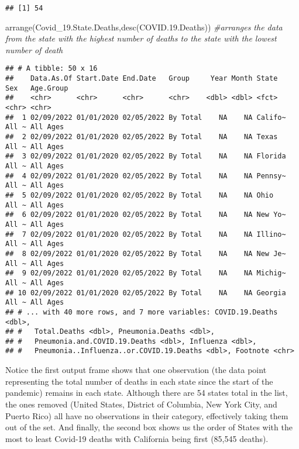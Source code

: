 \documentclass[
]{article}
\newenvironment{Shaded}{\begin{snugshade}}{\end{snugshade}}
\newcommand{\CommentTok}[1]{\textcolor[rgb]{0.56,0.35,0.01}{\textit{#1}}}
\newcommand{\FloatTok}[1]{\textcolor[rgb]{0.00,0.00,0.81}{#1}}
\newcommand{\FunctionTok}[1]{\textcolor[rgb]{0.00,0.00,0.00}{#1}}
\newcommand{\NormalTok}[1]{#1}
\begin{document}
\begin{verbatim}
## [1] 54
\end{verbatim}

\begin{Shaded}
\begin{Highlighting}[]
\FunctionTok{arrange}\NormalTok{(Covid\_19.State.Deaths,}\FunctionTok{desc}\NormalTok{(COVID.}\FloatTok{19.}\NormalTok{Deaths)) }\CommentTok{\#arranges the data from the state with the highest number of deaths to the state with the lowest number of death}
\end{Highlighting}
\end{Shaded}

\begin{verbatim}
## # A tibble: 50 x 16
##    Data.As.Of Start.Date End.Date   Group     Year Month State   Sex   Age.Group
##    <chr>      <chr>      <chr>      <chr>    <dbl> <dbl> <fct>   <chr> <chr>    
##  1 02/09/2022 01/01/2020 02/05/2022 By Total    NA    NA Califo~ All ~ All Ages 
##  2 02/09/2022 01/01/2020 02/05/2022 By Total    NA    NA Texas   All ~ All Ages 
##  3 02/09/2022 01/01/2020 02/05/2022 By Total    NA    NA Florida All ~ All Ages 
##  4 02/09/2022 01/01/2020 02/05/2022 By Total    NA    NA Pennsy~ All ~ All Ages 
##  5 02/09/2022 01/01/2020 02/05/2022 By Total    NA    NA Ohio    All ~ All Ages 
##  6 02/09/2022 01/01/2020 02/05/2022 By Total    NA    NA New Yo~ All ~ All Ages 
##  7 02/09/2022 01/01/2020 02/05/2022 By Total    NA    NA Illino~ All ~ All Ages 
##  8 02/09/2022 01/01/2020 02/05/2022 By Total    NA    NA New Je~ All ~ All Ages 
##  9 02/09/2022 01/01/2020 02/05/2022 By Total    NA    NA Michig~ All ~ All Ages 
## 10 02/09/2022 01/01/2020 02/05/2022 By Total    NA    NA Georgia All ~ All Ages 
## # ... with 40 more rows, and 7 more variables: COVID.19.Deaths <dbl>,
## #   Total.Deaths <dbl>, Pneumonia.Deaths <dbl>,
## #   Pneumonia.and.COVID.19.Deaths <dbl>, Influenza <dbl>,
## #   Pneumonia..Influenza..or.COVID.19.Deaths <dbl>, Footnote <chr>
\end{verbatim}

Notice the first output frame shows that one observation (the data point
representing the total number of deaths in each state since the start of
the pandemic) remains in each state. Although there are 54 states total
in the list, the ones removed (United States, District of Columbia, New
York City, and Puerto Rico) all have no observations in their category,
effectively taking them out of the set. And finally, the second box
shows us the order of States with the most to least Covid-19 deaths with
California being first (85,545 deaths).
\end{document}
